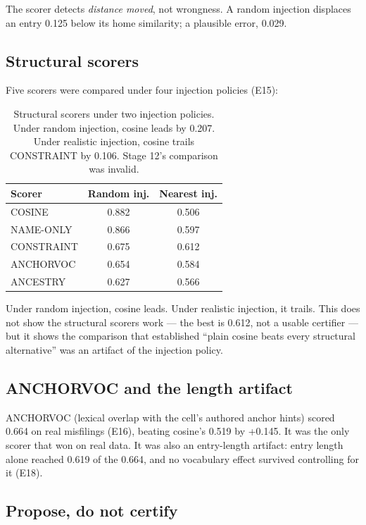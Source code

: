 \documentclass[11pt]{article}
\begin{document}
The scorer detects \emph{distance moved}, not wrongness. A random injection
displaces an entry 0.125 below its home similarity; a plausible error,
0.029.

\subsection{Structural scorers}

Five scorers were compared under four injection policies (E15):

\begin{table}[h]
\centering
\begin{tabular}{lcc}
\toprule
\textbf{Scorer} & \textbf{Random inj.} & \textbf{Nearest inj.} \\
\midrule
COSINE & 0.882 & 0.506 \\
NAME-ONLY & 0.866 & 0.597 \\
CONSTRAINT & 0.675 & 0.612 \\
ANCHORVOC & 0.654 & 0.584 \\
ANCESTRY & 0.627 & 0.566 \\
\bottomrule
\end{tabular}
\caption{Structural scorers under two injection policies. Under random
injection, cosine leads by 0.207. Under realistic injection, cosine trails
CONSTRAINT by 0.106. Stage 12's comparison was invalid.}
\label{tab:scorers}
\end{table}

Under random injection, cosine leads. Under realistic injection, it
trails. This does not show the structural scorers work --- the best is
0.612, not a usable certifier --- but it shows the comparison that
established ``plain cosine beats every structural alternative'' was an
artifact of the injection policy.

\subsection{ANCHORVOC and the length artifact}

ANCHORVOC (lexical overlap with the cell's authored anchor hints) scored
0.664 on real misfilings (E16), beating cosine's 0.519 by +0.145. It was
the only scorer that won on real data. It was also an entry-length
artifact: entry length alone reached 0.619 of the 0.664, and no vocabulary
effect survived controlling for it (E18).

\subsection{Propose, do not certify}
\end{document}
